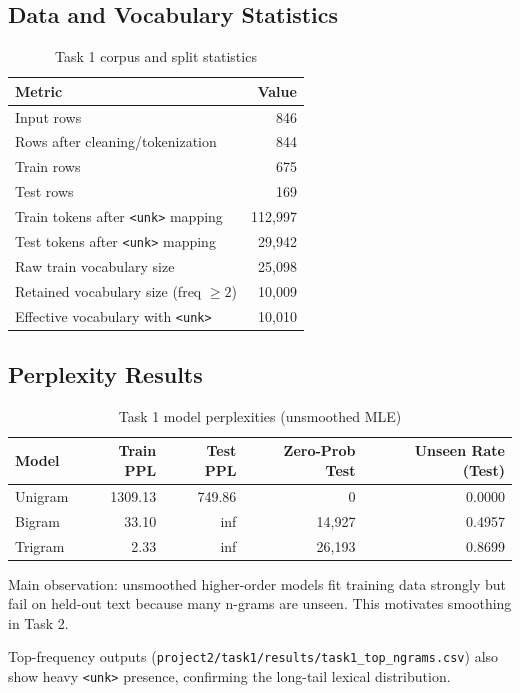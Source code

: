 \documentclass[10pt,a4paper]{article}
\begin{document}
\subsection{Data and Vocabulary Statistics}
\begin{table}[H]
\centering
\caption{Task 1 corpus and split statistics}
\label{tab:task1-stats}
\begin{tabular}{lr}
\toprule
\textbf{Metric} & \textbf{Value} \\
\midrule
Input rows & 846 \\
Rows after cleaning/tokenization & 844 \\
Train rows & 675 \\
Test rows & 169 \\
Train tokens after \texttt{<unk>} mapping & 112,997 \\
Test tokens after \texttt{<unk>} mapping & 29,942 \\
Raw train vocabulary size & 25,098 \\
Retained vocabulary size (freq $\geq 2$) & 10,009 \\
Effective vocabulary with \texttt{<unk>} & 10,010 \\
\bottomrule
\end{tabular}
\end{table}

\subsection{Perplexity Results}
\begin{table}[H]
\centering
\caption{Task 1 model perplexities (unsmoothed MLE)}
\label{tab:task1-ppl}
\begin{tabular}{lrrrr}
\toprule
\textbf{Model} & \textbf{Train PPL} & \textbf{Test PPL} & \textbf{Zero-Prob Test} & \textbf{Unseen Rate (Test)} \\
\midrule
Unigram & 1309.13 & 749.86 & 0 & 0.0000 \\
Bigram & 33.10 & inf & 14,927 & 0.4957 \\
Trigram & 2.33 & inf & 26,193 & 0.8699 \\
\bottomrule
\end{tabular}
\end{table}

Main observation: unsmoothed higher-order models fit training data strongly but fail on held-out text because many n-grams are unseen. This motivates smoothing in Task 2.

Top-frequency outputs (\texttt{project2/task1/results/task1\_top\_ngrams.csv}) also show heavy \texttt{<unk>} presence, confirming the long-tail lexical distribution.
\end{document}
